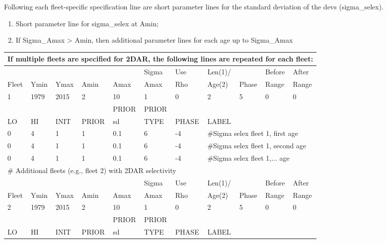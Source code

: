 Following each fleet-specific specification line are short parameter lines for the standard deviation of the devs (sigma\_selex).

\begin{enumerate}
	\item Short parameter line for sigma\_selex at Amin;
	\item If Sigma\_Amax > Amin, then additional parameter lines for each age up to Sigma\_Amax
\end{enumerate}

\begin{longtable}{p{1cm} p{1cm} p{1cm} p{1.25cm} p{1.25cm} p{1.25cm} p{1.2cm} p{1.2cm} p{1cm} p{1cm} p{1cm}}
	\multicolumn{11}{l}{If multiple fleets are specified for 2DAR, the following lines are repeated for each fleet:} \\
	\hline
	\Tstrut &    &      &      &      & Sigma & Use & Len(1)/ &       & Before & After \\
	Fleet & Ymin & Ymax & Amin & Amax & Amax  & Rho & Age(2)  & Phase & Range  & Range \Bstrut\\
	\hline
	   1    & 1979 & 2015 &  2   &  10  & 1     & 0   & 2       & 5     & 0   & 0 \Tstrut\\
	\hline
	     &    &      &     & PRIOR    & PRIOR &       &     & & & \Tstrut\\
	LO & HI & INIT & PRIOR & \gls{sd} & TYPE  & PHASE & \multicolumn{4}{l}{LABEL} \Bstrut\\
	\hline
	 0 & 4 & 1 & 1 & 0.1 & 6 & -4 & \multicolumn{4}{l}{\#Sigma selex fleet 1, first age} \Tstrut\\
	 0 & 4 & 1 & 1 & 0.1 & 6 & -4 & \multicolumn{4}{l}{\#Sigma selex fleet 1, second age} \Tstrut\\
	 0 & 4 & 1 & 1 & 0.1 & 6 & -4 & \multicolumn{4}{l}{\#Sigma selex fleet 1,... age} \Tstrut\\
	\hline
	\multicolumn{11}{l}{\# Additional fleets (e.g., fleet 2) with 2DAR selectivity} \\
	\Tstrut &    &      &      &      & Sigma & Use & Len(1)/ &       & Before & After \\
	Fleet & Ymin & Ymax & Amin & Amax & Amax  & Rho & Age(2)  & Phase & Range  & Range \Bstrut\\
	\hline
	2    & 1979 & 2015 &  2   &  10  & 1     & 0   & 2       & 5     & 0   & 0 \Tstrut\\
	\hline
	   &    &      &       & PRIOR    & PRIOR &       &     & & & \Tstrut\\
	LO & HI & INIT & PRIOR & \gls{sd} & TYPE  & PHASE & \multicolumn{4}{l}{LABEL} \Bstrut\\

\end{longtable}
